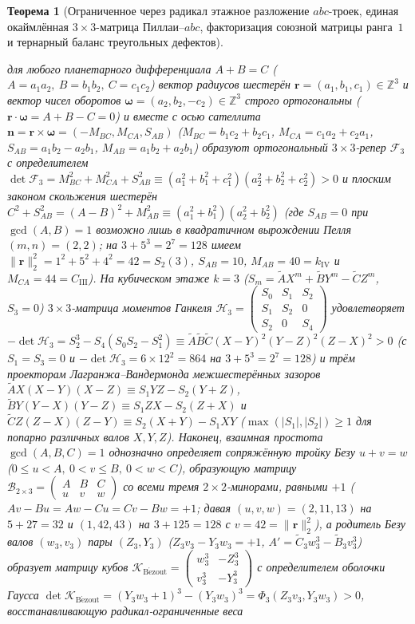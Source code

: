 \documentclass[11pt,a4paper]{article}
\theoremstyle{plain}
\newtheorem{theorem}{Теорема}[section]
\theoremstyle{definition}
\begin{document}
\begin{theorem}[Ограниченное через радикал этажное разложение $abc$-троек, единая окаймлённая $3\times 3$-матрица Пиллаи--$abc$, факторизация союзной матрицы ранга~$1$ и тернарный баланс треугольных дефектов]
\begin{enumerate}[label=\textbf{(\roman*)},leftmargin=*]
  для любого планетарного дифференциала $A + B = C$ ($A = a_1 a_2,\ B = b_1 b_2,\ C = c_1 c_2$) вектор радиусов шестерён $\mathbf{r} = (a_1,b_1,c_1)\in\mathbb{Z}^3$ и вектор чисел оборотов $\mathbf{\omega} = (a_2,b_2,-c_2)\in\mathbb{Z}^3$ строго ортогональны ($\mathbf{r}\cdot\mathbf{\omega} = A+B-C = 0$) и вместе с осью сателлита $\mathbf{n} = \mathbf{r}\times\mathbf{\omega} = (-M_{BC},M_{CA},S_{AB})$ ($M_{BC} = b_1 c_2 + b_2 c_1$, $M_{CA} = c_1 a_2 + c_2 a_1$, $S_{AB} = a_1 b_2 - a_2 b_1$, $M_{AB} = a_1 b_2 + a_2 b_1$) образуют ортогональный $3\times 3$-репер $\mathcal{F}_3$ с определителем $\det\mathcal{F}_3 = M_{BC}^2 + M_{CA}^2 + S_{AB}^2 \equiv (a_1^2+b_1^2+c_1^2)(a_2^2+b_2^2+c_2^2) > 0$ и плоским законом скольжения шестерён $C^2 + S_{AB}^2 = (A-B)^2 + M_{AB}^2 \equiv (a_1^2+b_1^2)(a_2^2+b_2^2)$ (где $S_{AB}=0$ при $\gcd(A,B)=1$ возможно лишь в квадратичном вырождении Пелля $(m,n)=(2,2)$; на $3+5^3=2^7=128$ имеем $\|\mathbf{r}\|_2^2 = 1^2+5^2+4^2 = 42 = S_2(3)$, $S_{AB}=10$, $M_{AB}=40=k_{\mathrm{IV}}$ и $M_{CA}=44=C_{\mathrm{III}}$). На кубическом этаже $k=3$ ($S_m = \widetilde{A}X^m + \widetilde{B}Y^m - \widetilde{C}Z^m$, $S_3 = 0$) $3\times 3$-матрица моментов Ганкеля $\mathcal{H}_3 = \begin{pmatrix} S_0 & S_1 & S_2 \\ S_1 & S_2 & 0 \\ S_2 & 0 & S_4 \end{pmatrix}$ удовлетворяет $-\det\mathcal{H}_3 = S_2^3 - S_4(S_0 S_2 - S_1^2) \equiv \widetilde{A}\widetilde{B}\widetilde{C}(X-Y)^2(Y-Z)^2(Z-X)^2 > 0$ (с $S_1 = S_3 = 0$ и $-\det\mathcal{H}_3 = 6\times 12^2 = 864$ на $3+5^3=2^7=128$) и трём проекторам Лагранжа--Вандермонда межшестерённых зазоров $\widetilde{A}X(X-Y)(X-Z) \equiv S_1 YZ - S_2(Y+Z)$, $\widetilde{B}Y(Y-X)(Y-Z) \equiv S_1 ZX - S_2(Z+X)$ и $\widetilde{C}Z(Z-X)(Z-Y) \equiv S_2(X+Y) - S_1 XY$ ($\max(|S_1|,|S_2|)\ge 1$ для попарно различных валов $X,Y,Z$). Наконец, взаимная простота $\gcd(A,B,C)=1$ однозначно определяет сопряжённую тройку Безу $u+v=w$ ($0\le u < A,\ 0 < v \le B,\ 0 < w < C$), образующую матрицу $\mathcal{B}_{2\times 3} = \begin{pmatrix} A & B & C \\ u & v & w \end{pmatrix}$ со всеми тремя $2\times 2$-минорами, равными $+1$ ($Av-Bu = Aw-Cu = Cv-Bw = +1$; давая $(u,v,w) = (2,11,13)$ на $5+27=32$ и $(1,42,43)$ на $3+125=128$ с $v=42=\|\mathbf{r}\|_2^2$), а родитель Безу валов $(w_3,v_3)$ пары $(Z_3,Y_3)$ ($Z_3 v_3 - Y_3 w_3 = +1$, $A' = \widetilde{C}_3 w_3^3 - \widetilde{B}_3 v_3^3$) образует матрицу кубов $\mathcal{K}_{\mathrm{B\acute{e}zout}} = \begin{pmatrix} w_3^3 & -Z_3^3 \\ v_3^3 & -Y_3^3 \end{pmatrix}$ с определителем оболочки Гаусса $\det\mathcal{K}_{\mathrm{B\acute{e}zout}} = (Y_3 w_3+1)^3 - (Y_3 w_3)^3 = \Phi_3(Z_3 v_3, Y_3 w_3) > 0$, восстанавливающую радикал-ограниченные веса 
\end{enumerate}
\end{theorem}
\end{document}
